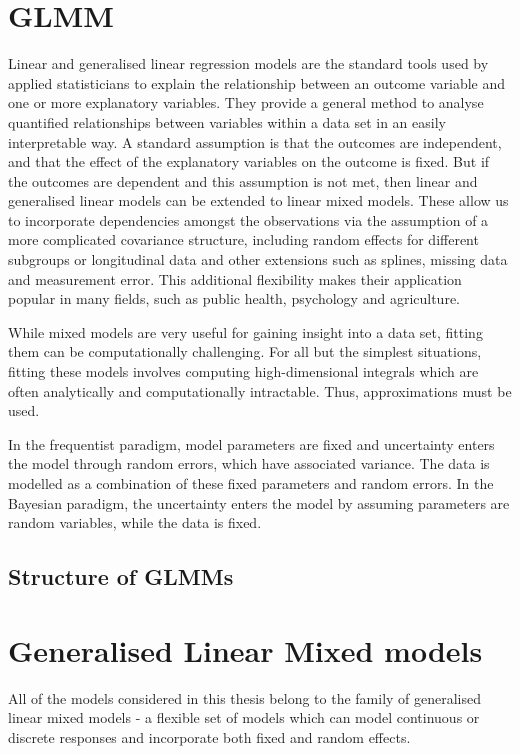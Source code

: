 \documentclass{amsart}[12pt]
\begin{document}
\section{GLMM}
Linear and generalised linear regression models are the standard tools used by applied statisticians to
explain the relationship between an outcome variable and one or more explanatory variables. They provide a
general method  to analyse quantified relationships between variables within a data set in an easily
interpretable way. A standard assumption is that the outcomes are independent, and that the effect of the
explanatory variables on the outcome is fixed. But if the outcomes are dependent and this assumption is not
met, then linear and generalised linear models can be extended to linear mixed models. These allow us to
incorporate dependencies amongst the  observations via the assumption of a more complicated covariance
structure, including random effects for  different subgroups or longitudinal data and other extensions such as
splines, missing data and measurement error. This additional flexibility makes their application popular in
many fields, such as public health, psychology and agriculture.

While mixed models are very useful for gaining insight into a data set, fitting them can be computationally
challenging. For all but the simplest situations, fitting these models involves computing high-dimensional
integrals which are often analytically and computationally intractable. Thus, approximations must be used.

In the frequentist paradigm, model parameters are fixed and uncertainty enters the model through random
errors, which have associated variance. The data is modelled as a combination of these fixed parameters and
random errors. In the Bayesian paradigm, the uncertainty enters the model by assuming parameters are random
variables, while the data is fixed.

\subsection{Structure of GLMMs}

\section{Generalised Linear Mixed models}
All of the models considered in this thesis belong to the family of generalised linear mixed models - a
flexible set of models which can model continuous or discrete responses and incorporate both fixed and
random effects.
\end{document}

